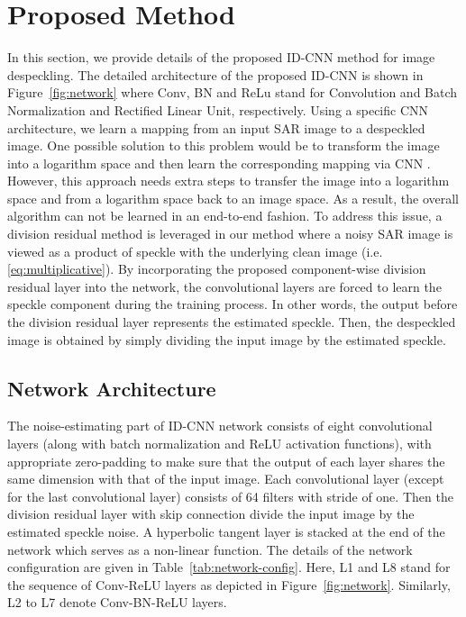 \documentclass[journal]{IEEEtran}
\begin{document}
\section{Proposed Method}\label{sec:method}
In this section, we provide details of the proposed ID-CNN method for image despeckling. The detailed architecture of the proposed ID-CNN is shown in Figure~\ref{fig:network} where Conv, BN and ReLu stand for Convolution and Batch Normalization and Rectified Linear Unit, respectively.  Using a specific CNN architecture, we learn a mapping from an input SAR image to a despeckled image.  One possible solution to this problem would be to transform the image into a logarithm space and then learn the corresponding mapping via CNN \cite{sarcnn}. However, this approach needs extra steps to transfer the image into a logarithm space and from a logarithm space back to an image space. As a result, the overall algorithm can not be learned in an end-to-end fashion.  To address this issue, a division residual method is leveraged in our method where a noisy SAR image is viewed as a product of speckle with the underlying clean image (i.e. \eqref{eq:multiplicative}).  By incorporating the proposed component-wise division residual layer into the network,  the convolutional layers are forced to learn the speckle component during the training process.  In other words, the output before the division residual layer represents the estimated speckle.  Then, the despeckled image is obtained by simply dividing the input image by the estimated speckle.  



\subsection{Network Architecture}
The noise-estimating part of ID-CNN network consists of eight convolutional layers (along with batch normalization and ReLU activation functions), with appropriate  zero-padding to make sure that the output of each layer shares the same dimension with that of the input image.  Each convolutional layer (except for the last convolutional layer) consists of 64 filters with stride of one. Then the division residual layer with skip connection divide the input image by the estimated speckle noise. A hyperbolic tangent layer is stacked at the end of the network which serves as a non-linear function. The details of the network configuration are given in Table~\ref{tab:network-config}. Here, L1 and L8 stand for the sequence of Conv-ReLU layers as depicted in Figure~\ref{fig:network}. Similarly, L2 to L7 denote Conv-BN-ReLU layers.
\end{document}
